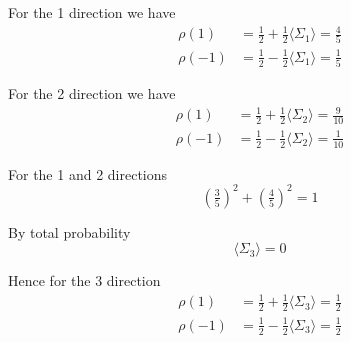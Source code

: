


\bigskip
For the 1 direction we have
\begin{align*}
\rho(1)&=\tfrac{1}{2}+\tfrac{1}{2}\langle\Sigma_1\rangle=\tfrac{4}{5}
\\
\rho(-1)&=\tfrac{1}{2}-\tfrac{1}{2}\langle\Sigma_1\rangle=\tfrac{1}{5}
\end{align*}

For the 2 direction we have
\begin{align*}
\rho(1)&=\tfrac{1}{2}+\tfrac{1}{2}\langle\Sigma_2\rangle=\tfrac{9}{10}
\\
\rho(-1)&=\tfrac{1}{2}-\tfrac{1}{2}\langle\Sigma_2\rangle=\tfrac{1}{10}
\end{align*}

For the 1 and 2 directions
\begin{equation*}
\left(\tfrac{3}{5}\right)^2+\left(\tfrac{4}{5}\right)^2=1
\end{equation*}

By total probability
\begin{equation*}
\langle\Sigma_3\rangle=0
\end{equation*}

Hence for the 3 direction
\begin{align*}
\rho(1)&=\tfrac{1}{2}+\tfrac{1}{2}\langle\Sigma_3\rangle=\tfrac{1}{2}
\\
\rho(-1)&=\tfrac{1}{2}-\tfrac{1}{2}\langle\Sigma_3\rangle=\tfrac{1}{2}
\end{align*}


